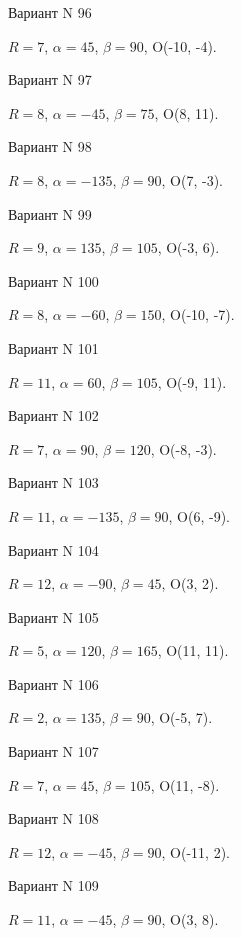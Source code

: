 \documentclass[11pt]{report}
\begin{document}
Вариант N 96

$R = 7$, $\alpha = 45$, $\beta = 90$, O(-10, -4).



Вариант N 97

$R = 8$, $\alpha = -45$, $\beta = 75$, O(8, 11).



Вариант N 98

$R = 8$, $\alpha = -135$, $\beta = 90$, O(7, -3).



Вариант N 99

$R = 9$, $\alpha = 135$, $\beta = 105$, O(-3, 6).



Вариант N 100

$R = 8$, $\alpha = -60$, $\beta = 150$, O(-10, -7).



Вариант N 101

$R = 11$, $\alpha = 60$, $\beta = 105$, O(-9, 11).



Вариант N 102

$R = 7$, $\alpha = 90$, $\beta = 120$, O(-8, -3).



Вариант N 103

$R = 11$, $\alpha = -135$, $\beta = 90$, O(6, -9).



Вариант N 104

$R = 12$, $\alpha = -90$, $\beta = 45$, O(3, 2).



Вариант N 105

$R = 5$, $\alpha = 120$, $\beta = 165$, O(11, 11).



Вариант N 106

$R = 2$, $\alpha = 135$, $\beta = 90$, O(-5, 7).



Вариант N 107

$R = 7$, $\alpha = 45$, $\beta = 105$, O(11, -8).



Вариант N 108

$R = 12$, $\alpha = -45$, $\beta = 90$, O(-11, 2).



Вариант N 109

$R = 11$, $\alpha = -45$, $\beta = 90$, O(3, 8).
\end{document}
